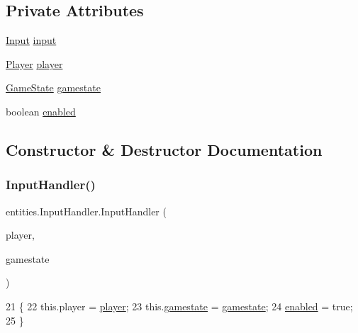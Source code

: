 \subsection*{Private Attributes}
\begin{DoxyCompactItemize}
\item 
\mbox{\hyperlink{classorg_1_1newdawn_1_1slick_1_1_input}{Input}} \mbox{\hyperlink{classentities_1_1_input_handler_a924ff1658e32e10d77694adf4856b26f}{input}}
\item 
\mbox{\hyperlink{classentities_1_1_player}{Player}} \mbox{\hyperlink{classentities_1_1_input_handler_a65bea2d31684e8d91db9ffef9268f9e9}{player}}
\item 
\mbox{\hyperlink{classstates_1_1_game_state}{Game\+State}} \mbox{\hyperlink{classentities_1_1_input_handler_a9f4e32826b3780c5310530d3db807df1}{gamestate}}
\item 
boolean \mbox{\hyperlink{classentities_1_1_input_handler_a438eff19a77640d2055a83c332aff302}{enabled}}
\end{DoxyCompactItemize}


\subsection{Constructor \& Destructor Documentation}
\mbox{\label{classentities_1_1_input_handler_a02a9317f35d6371983e903ef348e445a}} 
\subsubsection{\texorpdfstring{Input\+Handler()}{InputHandler()}}
{\footnotesize\ttfamily entities.\+Input\+Handler.\+Input\+Handler (\begin{DoxyParamCaption}\item[{\mbox{\hyperlink{classentities_1_1_player}{Player}}}]{player,  }\item[{\mbox{\hyperlink{classstates_1_1_game_state}{Game\+State}}}]{gamestate }\end{DoxyParamCaption})\hspace{0.3cm}{\ttfamily [inline]}}


\begin{DoxyCode}
21                                                             \{
22         this.player = \mbox{\hyperlink{classentities_1_1_input_handler_a65bea2d31684e8d91db9ffef9268f9e9}{player}};
23         this.\mbox{\hyperlink{classentities_1_1_input_handler_a9f4e32826b3780c5310530d3db807df1}{gamestate}} = \mbox{\hyperlink{classentities_1_1_input_handler_a9f4e32826b3780c5310530d3db807df1}{gamestate}};
24         \mbox{\hyperlink{classentities_1_1_input_handler_a438eff19a77640d2055a83c332aff302}{enabled}} = \textcolor{keyword}{true};
25     \}
\end{DoxyCode}


